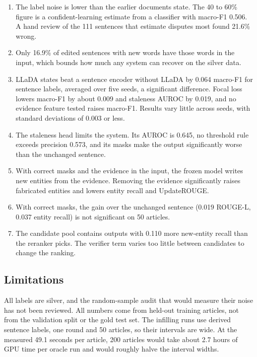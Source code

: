 \documentclass[]{paper}
\begin{document}
\begin{enumerate}
\item The label noise is lower than the earlier documents state. The 40 to 60\% figure is a confident-learning estimate from a classifier with macro-F1 0.506. A hand review of the 111 sentences that estimate disputes most found 21.6\% wrong.
\item Only 16.9\% of edited sentences with new words have those words in the input, which bounds how much any system can recover on the silver data.
\item LLaDA states beat a sentence encoder without LLaDA by 0.064 macro-F1 for sentence labels, averaged over five seeds, a significant difference. Focal loss lowers macro-F1 by about 0.009 and staleness AUROC by 0.019, and no evidence feature tested raises macro-F1. Results vary little across seeds, with standard deviations of 0.003 or less.
\item The staleness head limits the system. Its AUROC is 0.645, no threshold rule exceeds precision 0.573, and its masks make the output significantly worse than the unchanged sentence.
\item With correct masks and the evidence in the input, the frozen model writes new entities from the evidence. Removing the evidence significantly raises fabricated entities and lowers entity recall and UpdateROUGE.
\item With correct masks, the gain over the unchanged sentence (0.019 ROUGE-L, 0.037 entity recall) is not significant on 50 articles.
\item The candidate pool contains outputs with 0.110 more new-entity recall than the reranker picks. The verifier term varies too little between candidates to change the ranking.
\end{enumerate}

\subsection{Limitations}

All labels are silver, and the random-sample audit that would measure their noise has not been reviewed. All numbers come from held-out training articles, not from the validation split or the gold test set. The infilling runs use derived sentence labels, one round and 50 articles, so their intervals are wide. At the measured 49.1 seconds per article, 200 articles would take about 2.7 hours of GPU time per oracle run and would roughly halve the interval widths.
\end{document}
